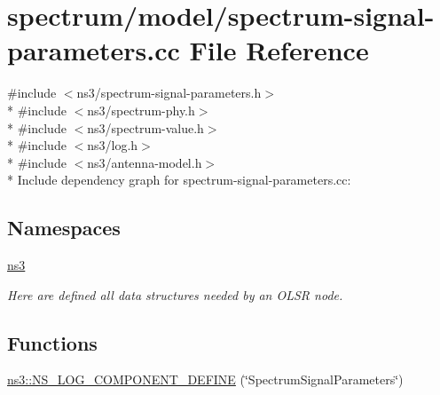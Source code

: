 \hypertarget{spectrum-signal-parameters_8cc}{}\section{spectrum/model/spectrum-\/signal-\/parameters.cc File Reference}
\label{spectrum-signal-parameters_8cc}
{\ttfamily \#include $<$ns3/spectrum-\/signal-\/parameters.\+h$>$}\\*
{\ttfamily \#include $<$ns3/spectrum-\/phy.\+h$>$}\\*
{\ttfamily \#include $<$ns3/spectrum-\/value.\+h$>$}\\*
{\ttfamily \#include $<$ns3/log.\+h$>$}\\*
{\ttfamily \#include $<$ns3/antenna-\/model.\+h$>$}\\*
Include dependency graph for spectrum-\/signal-\/parameters.cc\+:
\subsection*{Namespaces}
\begin{DoxyCompactItemize}
\item 
 \hyperlink{namespacens3}{ns3}
\begin{DoxyCompactList}\small\item\em Here are defined all data structures needed by an O\+L\+SR node. \end{DoxyCompactList}\end{DoxyCompactItemize}
\subsection*{Functions}
\begin{DoxyCompactItemize}
\item 
\hyperlink{namespacens3_a34818333ccfbd3deda8b9a4e23487be5}{ns3\+::\+N\+S\+\_\+\+L\+O\+G\+\_\+\+C\+O\+M\+P\+O\+N\+E\+N\+T\+\_\+\+D\+E\+F\+I\+NE} (\char`\"{}Spectrum\+Signal\+Parameters\char`\"{})
\end{DoxyCompactItemize}
